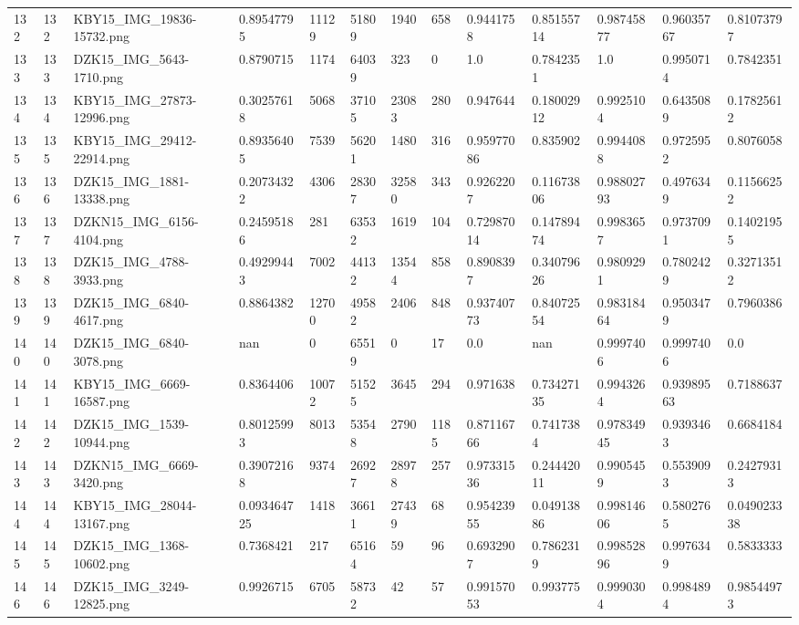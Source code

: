 \documentclass[11pt, a4paper, twoside]{report}
\begin{document}
\begin{longtable}[c]{@{}lllllllllllll@{}}
132 & 132 & KBY15\_IMG\_19836-15732.png & 0.89547795 & 11129 & 51809 & 1940 & 658 & 0.9441758 & 0.85155714 & 0.98745877 & 0.96035767 & 0.81073797 \\
133 & 133 & DZK15\_IMG\_5643-1710.png & 0.8790715 & 1174 & 64039 & 323 & 0 & 1.0 & 0.7842351 & 1.0 & 0.9950714 & 0.7842351 \\
134 & 134 & KBY15\_IMG\_27873-12996.png & 0.30257618 & 5068 & 37105 & 23083 & 280 & 0.947644 & 0.18002912 & 0.9925104 & 0.6435089 & 0.17825612 \\
135 & 135 & KBY15\_IMG\_29412-22914.png & 0.89356405 & 7539 & 56201 & 1480 & 316 & 0.95977086 & 0.835902 & 0.9944088 & 0.9725952 & 0.8076058 \\
136 & 136 & DZK15\_IMG\_1881-13338.png & 0.20734322 & 4306 & 28307 & 32580 & 343 & 0.9262207 & 0.11673806 & 0.98802793 & 0.4976349 & 0.11566252 \\
137 & 137 & DZKN15\_IMG\_6156-4104.png & 0.24595186 & 281 & 63532 & 1619 & 104 & 0.72987014 & 0.14789474 & 0.9983657 & 0.9737091 & 0.14021955 \\
138 & 138 & DZK15\_IMG\_4788-3933.png & 0.49299443 & 7002 & 44132 & 13544 & 858 & 0.8908397 & 0.34079626 & 0.9809291 & 0.7802429 & 0.32713512 \\
139 & 139 & DZK15\_IMG\_6840-4617.png & 0.8864382 & 12700 & 49582 & 2406 & 848 & 0.93740773 & 0.84072554 & 0.98318464 & 0.9503479 & 0.7960386 \\
140 & 140 & DZK15\_IMG\_6840-3078.png & nan & 0 & 65519 & 0 & 17 & 0.0 & nan & 0.9997406 & 0.9997406 & 0.0 \\
141 & 141 & KBY15\_IMG\_6669-16587.png & 0.8364406 & 10072 & 51525 & 3645 & 294 & 0.971638 & 0.73427135 & 0.9943264 & 0.93989563 & 0.7188637 \\
142 & 142 & DZK15\_IMG\_1539-10944.png & 0.80125993 & 8013 & 53548 & 2790 & 1185 & 0.87116766 & 0.7417384 & 0.97834945 & 0.9393463 & 0.6684184 \\
143 & 143 & DZKN15\_IMG\_6669-3420.png & 0.39072168 & 9374 & 26927 & 28978 & 257 & 0.97331536 & 0.24442011 & 0.9905459 & 0.5539093 & 0.24279313 \\
144 & 144 & KBY15\_IMG\_28044-13167.png & 0.093464725 & 1418 & 36611 & 27439 & 68 & 0.95423955 & 0.04913886 & 0.99814606 & 0.5802765 & 0.049023338 \\
145 & 145 & DZK15\_IMG\_1368-10602.png & 0.7368421 & 217 & 65164 & 59 & 96 & 0.6932907 & 0.7862319 & 0.99852896 & 0.9976349 & 0.5833333 \\
146 & 146 & DZK15\_IMG\_3249-12825.png & 0.9926715 & 6705 & 58732 & 42 & 57 & 0.99157053 & 0.993775 & 0.9990304 & 0.9984894 & 0.98544973 \\

\end{longtable}
\end{document}
